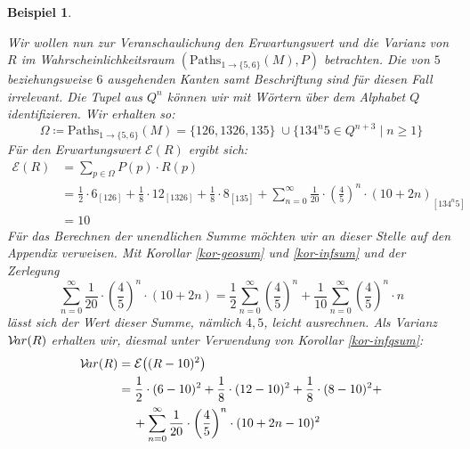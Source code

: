 \documentclass[a4paper]{article}
\newtheorem{beispiel}[satz]{Beispiel}
\theoremstyle{nonumberplain}
\begin{document}
\begin{beispiel}
\begin{center}
	\end{center}
	Wir wollen nun zur Veranschaulichung den Erwartungswert und die Varianz von $R$ im Wahrscheinlichkeitsraum $(\mathrm{Paths}_{1 \rightarrow \{5,6\}}(M), P)$ betrachten. Die von $5$ beziehungsweise $6$ ausgehenden Kanten samt Beschriftung sind für diesen Fall irrelevant. Die Tupel aus $Q^n$ können wir mit Wörtern über dem Alphabet $Q$ identifizieren. Wir erhalten so:
	\begin{equation*}
	\Omega \coloneqq \mathrm{Paths}_{1 \rightarrow \{5,6\}}(M) = \big\{126,1326,135\big\} \; \cup \big\{134^n5 \in Q^{n+3} \mid n\geq 1\big\} 
	\end{equation*}
	Für den Erwartungswert $\mathcal{E}(R)$ ergibt sich:
	\newcommand{\exres}{10}
	\begin{align*}
	\mathcal{E}(R) & = \sum_{p \in \Omega}{P(p) \cdot R(p)}\\
	& = \frac{1}{2}\cdot 6_{\scriptscriptstyle [126]} + \frac{1}{8}\cdot 12_{\scriptscriptstyle [1326]} + \frac{1}{8}\cdot 8_{\scriptscriptstyle [135]} + \sum_{n = 0}^{\infty}{\frac{1}{20}\cdot\left(\frac{4}{5}\right)^n \cdot (10 + 2n)}_{\scriptscriptstyle [134^n5]} \\
	& = \exres{}
	\end{align*}
	Für das Berechnen der unendlichen Summe möchten wir an dieser Stelle auf den Appendix verweisen. Mit Korollar \ref{kor-geosum} und \ref{kor-infsum} und der Zerlegung
	\begin{equation*}
		\sum_{n = 0}^{\infty}{\frac{1}{20}\cdot\left(\frac{4}{5}\right)^n \cdot (10 + 2n)}
		= \frac{1}{2}\sum_{n = 0}^{\infty}{\left(\frac{4}{5}\right)^n} + \frac{1}{10} \sum_{n = 0}^{\infty}{\left(\frac{4}{5}\right)^n \cdot n}
	\end{equation*}
	lässt sich der Wert dieser Summe, nämlich $4,5$, leicht ausrechnen.
	Als Varianz $\mathcal{V}\!ar(R)$ erhalten wir, diesmal unter Verwendung von Korollar \ref{kor-infqsum}:
	\begin{align*}
		\mvar(R) & = \mathcal{E}\big((R - \exres{})^2\big) \\
		& = \frac{1}{2}\cdot (6 - \exres)^2+ \frac{1}{8}\cdot (12-\exres)^2 + \frac{1}{8}\cdot (8-\exres)^2 + \\
		& \hspace{1.2em} + \sum_{n = 0}^{\infty}{\frac{1}{20}\cdot\left(\frac{4}{5}\right)^n \cdot (10 + 2n - \exres)^2} \\

\end{align*}
\end{beispiel}
\end{document}

